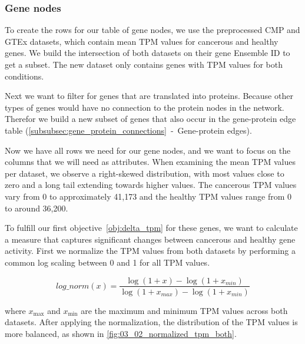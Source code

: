\subsubsection*{Gene nodes} \label{subsubsec:gene_nodes}

To create the rows for our table of gene nodes, we use the preprocessed CMP and GTEx datasets,
which contain mean TPM values for cancerous and healthy genes.
We build the intersection of both datasets on their gene Ensemble ID to get a subset.
The new dataset only contains genes with TPM values for both conditions.

Next we want to filter for genes that are translated into proteins.
Because other types of genes would have no connection to the protein nodes in the network.
Therefor we build a new subset of genes that also occur in the gene-protein edge table (\ref{subsubsec:gene_protein_connections}~-~Gene-protein edges).

Now we have all rows we need for our gene nodes, and we want to focus on the columns that we will need as attributes.
When examining the mean TPM values per dataset, we observe a right-skewed distribution, with most values close to zero
and a long tail extending towards higher values.
The cancerous TPM values vary from 0 to approximately 41,173 and the healthy TPM values range from 0 to around 36,200.

To fulfill our first objective~\ref{obj:delta_tpm} for these genes,
we want to calculate a measure that captures significant changes between cancerous and healthy gene activity.
First we normalize the TPM values from both datasets by performing a common log scaling between 0 and 1 for all TPM values.

\begin{equation}
\label{eq:tpm_normalization}
log\_norm(x) = \frac{\log(1 + x) - \log(1 + x_{min})}{\log(1 + x_{max}) - \log(1 + x_{min})}
\end{equation}

where $x_{\max}$ and $x_{\min}$ are the maximum and minimum TPM values across both datasets.
After applying the normalization, the distribution of the TPM values is more balanced, as shown in \cref{fig:03_02_normalized_tpm_both}.

